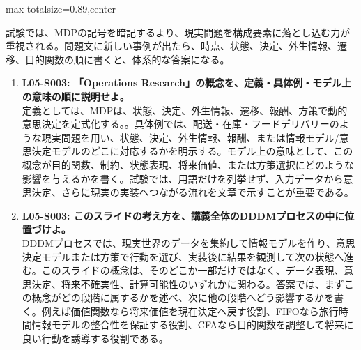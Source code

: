 \begin{minipage}[t]{0.58\textwidth}
\begin{adjustbox}{max totalsize={\textwidth}{0.89\textheight},center}
\begin{minipage}{\textwidth}
試験では、MDPの記号を暗記するより、現実問題を構成要素に落とし込む力が重視される。問題文に新しい事例が出たら、時点、状態、決定、外生情報、遷移、目的関数の順に書くと、体系的な答案になる。\par{}\begin{enumerate}\item \textbf{L05-S003: 「Operations Research」の概念を、定義・具体例・モデル上の意味の順に説明せよ。}\\定義としては、MDPは、状態、決定、外生情報、遷移、報酬、方策で動的意思決定を定式化する。。具体例では、配送・在庫・フードデリバリーのような現実問題を用い、状態、決定、外生情報、報酬、または情報モデル/意思決定モデルのどこに対応するかを明示する。モデル上の意味として、この概念が目的関数、制約、状態表現、将来価値、または方策選択にどのような影響を与えるかを書く。試験では、用語だけを列挙せず、入力データから意思決定、さらに現実の実装へつながる流れを文章で示すことが重要である。\item \textbf{L05-S003: このスライドの考え方を、講義全体のDDDMプロセスの中に位置づけよ。}\\DDDMプロセスでは、現実世界のデータを集約して情報モデルを作り、意思決定モデルまたは方策で行動を選び、実装後に結果を観測して次の状態へ進む。このスライドの概念は、そのどこか一部だけではなく、データ表現、意思決定、将来不確実性、計算可能性のいずれかに関わる。答案では、まずこの概念がどの段階に属するかを述べ、次に他の段階へどう影響するかを書く。例えば価値関数なら将来価値を現在決定へ戻す役割、FIFOなら旅行時間情報モデルの整合性を保証する役割、CFAなら目的関数を調整して将来に良い行動を誘導する役割である。\end{enumerate}
\end{minipage}
\end{adjustbox}
\end{minipage}


